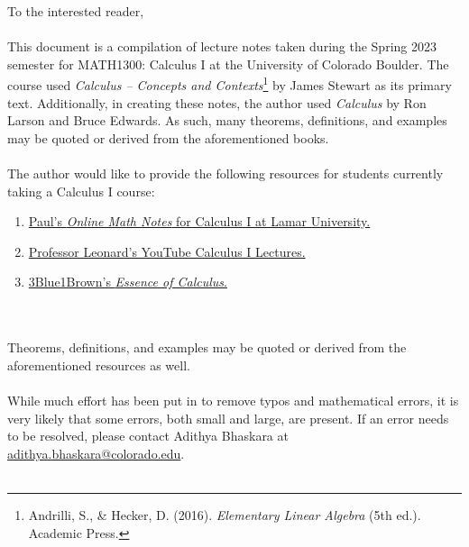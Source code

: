 To the interested reader,
\\
\\
This document is a compilation of lecture notes taken during the Spring 2023 semester for MATH1300: Calculus I at the University of Colorado Boulder. The course used \textit{Calculus -- Concepts and Contexts}\footnote{Andrilli, S., \& Hecker, D. (2016). \textit{Elementary Linear Algebra} (5th ed.). Academic Press.} by James Stewart as its primary text. Additionally, in creating these notes, the author used \textit{Calculus} by Ron Larson and Bruce Edwards. As such, many theorems, definitions, and examples may be quoted or derived from the aforementioned books.
\\
\\
The author would like to provide the following resources for students currently taking a Calculus I course:
\begin{enumerate}
    \item \href{https://tutorial.math.lamar.edu/classes/calci/calci.aspx}{Paul's \textit{Online Math Notes} for Calculus I at Lamar University.}
    \item \href{https://youtube.com/playlist?list=PLF797E961509B4EB5}{Professor Leonard's YouTube Calculus I Lectures.}
    \item \href{https://www.youtube.com/watch?v=WUvTyaaNkzM&list=PLZHQObOWTQDMsr9K-rj53DwVRMYO3t5Yr}{3Blue1Brown's \textit{Essence of Calculus}.}
\end{enumerate}
\vphantom
\\
\\
Theorems, definitions, and examples may be quoted or derived from the aforementioned resources as well.
\\
\\
While much effort has been put in to remove typos and mathematical errors, it is very likely that some errors, both small and large, are present. If an error needs to be resolved, please contact Adithya Bhaskara at \href{mailto:adithya.bhaskara@colorado.edu}{adithya.bhaskara@colorado.edu}.
\\
\\
\vfill
{}